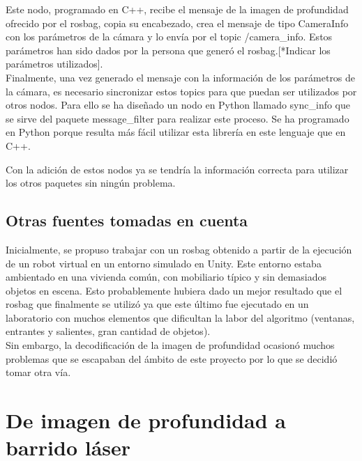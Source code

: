 
Este nodo, programado en C++, recibe el mensaje de la imagen de profundidad ofrecido por el rosbag, copia su encabezado, crea el mensaje de tipo CameraInfo con los parámetros de la cámara y lo envía por el topic /camera\_info. Estos parámetros han sido dados por la persona que generó el rosbag.[*Indicar los parámetros utilizados].\\

Finalmente, una vez generado el mensaje con la información de los parámetros de la cámara, es necesario sincronizar estos topics para que puedan ser utilizados por otros nodos. Para ello se ha diseñado un nodo en Python llamado sync\_info que se sirve del paquete message\_filter para realizar este proceso. Se ha programado en Python porque resulta más fácil utilizar esta librería en este lenguaje que en C++.\\


Con la adición de estos nodos ya se tendría la información correcta para utilizar los otros paquetes sin ningún problema.\\

\subsection{Otras fuentes tomadas en cuenta}

Inicialmente, se propuso trabajar con un rosbag obtenido a partir de la ejecución de un robot virtual en un entorno simulado en Unity. Este entorno estaba ambientado en una vivienda común, con mobiliario típico y sin demasiados objetos en escena. Esto probablemente hubiera dado un mejor resultado que el rosbag que finalmente se utilizó ya que este último fue ejecutado en un laboratorio con muchos elementos que dificultan la labor del algoritmo (ventanas, entrantes y salientes, gran cantidad de objetos).\\

Sin embargo, la decodificación de la imagen de profundidad ocasionó muchos problemas que se escapaban del ámbito de este proyecto por lo que se decidió tomar otra vía.\\

\section{De imagen de profundidad a barrido láser}

